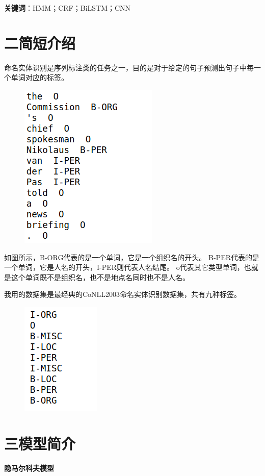 \documentclass[openany,oneside]{ctexbook}
\begin{document}
{\bfseries 关键词}：HMM；CRF；BiLSTM；CNN
\newpage

\chapter{\sihao\hei 二\quad 简短介绍}
命名实体识别是序列标注类的任务之一，目的是对于给定的句子预测出句子中每一个单词对应的标签。
\begin{figure}[htp]
    \centering
    \includegraphics[scale=0.5]{data_print.png}
\end{figure}
如图所示，B-ORG代表的是一个单词，它是一个组织名的开头。
B-PER代表的是一个单词，它是人名的开头，I-PER则代表人名结尾。
o代表其它类型单词，也就是这个单词既不是组织名，也不是地点名同时也不是人名。


我用的数据集是最经典的CoNLL2003命名实体识别数据集，共有九种标签。
\begin{figure}[htp]
   \centering
   \includegraphics[scale=0.8]{tags.png}
   
\end{figure}


\newpage
\chapter{\sihao\hei 三\quad 模型简介}
{\bfseries 隐马尔科夫模型}
\end{document}
